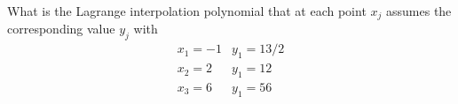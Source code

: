 \bexo


What is the Lagrange interpolation polynomial  that at each point $x_j$ assumes the corresponding value $y_j$
with 
\begin{eqnarray*}
x_1=-1&y_1=13/2\\	
x_2=2&y_1=12\\	
x_3=6&y_1=56\\	
\end{eqnarray*}

\begin{center}
\end{center}
 

\eexo
\solution{



}
